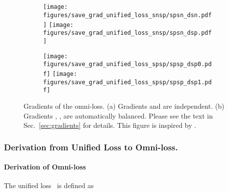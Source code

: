 \documentclass[paper_2425.tex]{subfiles}
\begin{document}
\appendix



\begin{center}
  \doparttoc \faketableofcontents \part{}
  \parttoc
  \vspace{2cm}
\end{center}




\begin{figure*}[t]
\begin{subfigure}{0.5\textwidth}
    \centering
\texttt{[image: figures/save\_grad\_unified\_loss\_snsp/spsn\_dsn.pdf]}
    \texttt{[image: figures/save\_grad\_unified\_loss\_snsp/spsn\_dsp.pdf]}
\caption{}
\end{subfigure}
  \hspace{0.1cm}
  \begin{subfigure}{.5\textwidth}
    \centering
\texttt{[image: figures/save\_grad\_unified\_loss\_spsp/spsp\_dsp0.pdf]}
    \texttt{[image: figures/save\_grad\_unified\_loss\_spsp/spsp\_dsp1.pdf]}
\caption{}
\end{subfigure}
  \vspace{-0.3cm}
  \caption{Gradients of the omni-loss. (a) Gradients \wrt  and  are independent. (b) Gradients \wrt , , are automatically balanced. Please see the text in Sec.~\ref{sec:gradients} for details. This figure is inspired by \cite{sun2020Circle}.}
  \vspace{-0.3cm}
  \label{fig:gradient}
\end{figure*}

\section{Derivation from Unified Loss to Omni-loss.}
\label{apx:derivation_omniloss}


\subsection{Derivation of Omni-loss}

The unified loss~\cite{sun2020Circle} is defined as
\end{document}
